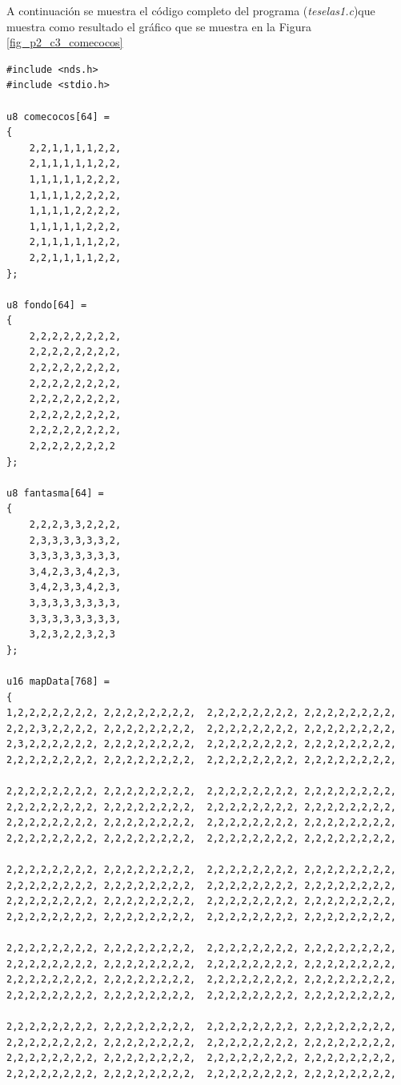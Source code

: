 \begin{example}
A continuación se muestra el código completo del programa (\textit{teselas1.c})que muestra como resultado el gráfico que se muestra en la Figura \ref{fig_p2_c3_comecocos}

\begin{lstlisting}
#include <nds.h>
#include <stdio.h>

u8 comecocos[64] =
{
	2,2,1,1,1,1,2,2,
	2,1,1,1,1,1,2,2,
	1,1,1,1,1,2,2,2,
	1,1,1,1,2,2,2,2,
	1,1,1,1,2,2,2,2,
	1,1,1,1,1,2,2,2,
	2,1,1,1,1,1,2,2,
	2,2,1,1,1,1,2,2,
};

u8 fondo[64] =
{
	2,2,2,2,2,2,2,2,
	2,2,2,2,2,2,2,2,
	2,2,2,2,2,2,2,2,
	2,2,2,2,2,2,2,2,
	2,2,2,2,2,2,2,2,
	2,2,2,2,2,2,2,2,
	2,2,2,2,2,2,2,2,
	2,2,2,2,2,2,2,2
};

u8 fantasma[64] =
{
	2,2,2,3,3,2,2,2,
	2,3,3,3,3,3,3,2,
	3,3,3,3,3,3,3,3,
	3,4,2,3,3,4,2,3,
	3,4,2,3,3,4,2,3,
	3,3,3,3,3,3,3,3,
	3,3,3,3,3,3,3,3,
	3,2,3,2,2,3,2,3
};

u16 mapData[768] =
{
1,2,2,2,2,2,2,2, 2,2,2,2,2,2,2,2,  2,2,2,2,2,2,2,2, 2,2,2,2,2,2,2,2,
2,2,2,3,2,2,2,2, 2,2,2,2,2,2,2,2,  2,2,2,2,2,2,2,2, 2,2,2,2,2,2,2,2,
2,3,2,2,2,2,2,2, 2,2,2,2,2,2,2,2,  2,2,2,2,2,2,2,2, 2,2,2,2,2,2,2,2,
2,2,2,2,2,2,2,2, 2,2,2,2,2,2,2,2,  2,2,2,2,2,2,2,2, 2,2,2,2,2,2,2,2,

2,2,2,2,2,2,2,2, 2,2,2,2,2,2,2,2,  2,2,2,2,2,2,2,2, 2,2,2,2,2,2,2,2,
2,2,2,2,2,2,2,2, 2,2,2,2,2,2,2,2,  2,2,2,2,2,2,2,2, 2,2,2,2,2,2,2,2,
2,2,2,2,2,2,2,2, 2,2,2,2,2,2,2,2,  2,2,2,2,2,2,2,2, 2,2,2,2,2,2,2,2,
2,2,2,2,2,2,2,2, 2,2,2,2,2,2,2,2,  2,2,2,2,2,2,2,2, 2,2,2,2,2,2,2,2,

2,2,2,2,2,2,2,2, 2,2,2,2,2,2,2,2,  2,2,2,2,2,2,2,2, 2,2,2,2,2,2,2,2,
2,2,2,2,2,2,2,2, 2,2,2,2,2,2,2,2,  2,2,2,2,2,2,2,2, 2,2,2,2,2,2,2,2,
2,2,2,2,2,2,2,2, 2,2,2,2,2,2,2,2,  2,2,2,2,2,2,2,2, 2,2,2,2,2,2,2,2,
2,2,2,2,2,2,2,2, 2,2,2,2,2,2,2,2,  2,2,2,2,2,2,2,2, 2,2,2,2,2,2,2,2,

2,2,2,2,2,2,2,2, 2,2,2,2,2,2,2,2,  2,2,2,2,2,2,2,2, 2,2,2,2,2,2,2,2,
2,2,2,2,2,2,2,2, 2,2,2,2,2,2,2,2,  2,2,2,2,2,2,2,2, 2,2,2,2,2,2,2,2,
2,2,2,2,2,2,2,2, 2,2,2,2,2,2,2,2,  2,2,2,2,2,2,2,2, 2,2,2,2,2,2,2,2,
2,2,2,2,2,2,2,2, 2,2,2,2,2,2,2,2,  2,2,2,2,2,2,2,2, 2,2,2,2,2,2,2,2,

2,2,2,2,2,2,2,2, 2,2,2,2,2,2,2,2,  2,2,2,2,2,2,2,2, 2,2,2,2,2,2,2,2,
2,2,2,2,2,2,2,2, 2,2,2,2,2,2,2,2,  2,2,2,2,2,2,2,2, 2,2,2,2,2,2,2,2,
2,2,2,2,2,2,2,2, 2,2,2,2,2,2,2,2,  2,2,2,2,2,2,2,2, 2,2,2,2,2,2,2,2,
2,2,2,2,2,2,2,2, 2,2,2,2,2,2,2,2,  2,2,2,2,2,2,2,2, 2,2,2,2,2,2,2,2,


\end{lstlisting}
\end{example}
